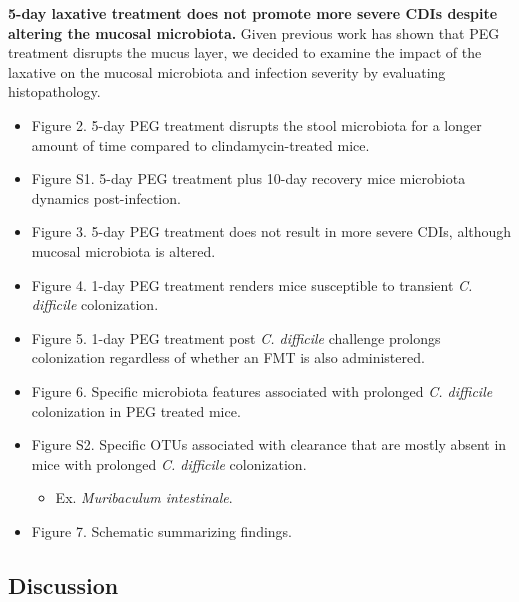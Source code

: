\documentclass[
  11pt,
]{article}
\providecommand{\tightlist}{%
  \setlength{\itemsep}{0pt}\setlength{\parskip}{0pt}}
\begin{document}
\textbf{5-day laxative treatment does not promote more severe CDIs
despite altering the mucosal microbiota.} Given previous work has shown
that PEG treatment disrupts the mucus layer, we decided to examine the
impact of the laxative on the mucosal microbiota and infection severity
by evaluating histopathology.

\begin{itemize}
\item
  Figure 2. 5-day PEG treatment disrupts the stool microbiota for a
  longer amount of time compared to clindamycin-treated mice.
\item
  Figure S1. 5-day PEG treatment plus 10-day recovery mice microbiota
  dynamics post-infection.
\item
  Figure 3. 5-day PEG treatment does not result in more severe CDIs,
  although mucosal microbiota is altered.
\item
  Figure 4. 1-day PEG treatment renders mice susceptible to transient
  \emph{C. difficile} colonization.
\item
  Figure 5. 1-day PEG treatment post \emph{C. difficile} challenge
  prolongs colonization regardless of whether an FMT is also
  administered.
\item
  Figure 6. Specific microbiota features associated with prolonged
  \emph{C. difficile} colonization in PEG treated mice.
\item
  Figure S2. Specific OTUs associated with clearance that are mostly
  absent in mice with prolonged \emph{C. difficile} colonization.

  \begin{itemize}
  \tightlist
  \item
    Ex. \emph{Muribaculum intestinale}.
  \end{itemize}
\item
  Figure 7. Schematic summarizing findings.
\end{itemize}

\hypertarget{discussion}{%
\subsection{Discussion}\label{discussion}}
\end{document}
